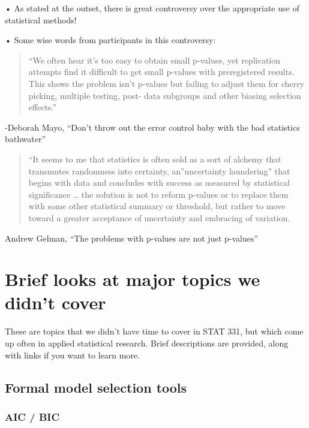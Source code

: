\documentclass[
  letterpaper,
  DIV=11,
  numbers=noendperiod]{scrreprt}
\begin{document}
• As stated at the outset, there is great controversy over the
appropriate use of statistical methods!

• Some wise words from participants in this controversy:

\begin{quote}
``We often hear it's too easy to obtain small p-values, yet replication
attempts find it difficult to get small p-values with preregistered
results. This shows the problem isn't p-values but failing to adjust
them for cherry picking, multiple testing, post- data subgroups and
other biasing selection effects.''
\end{quote}

-Deborah Mayo, ``Don't throw out the error control baby with the bad
statistics bathwater''

\begin{quote}
``It seems to me that statistics is often sold as a sort of alchemy that
transmutes randomness into certainty, an''uncertainty laundering'' that
begins with data and concludes with success as measured by statistical
significance \ldots{} the solution is not to reform p-values or to
replace them with some other statistical summary or threshold, but
rather to move toward a greater acceptance of uncertainty and embracing
of variation.
\end{quote}

Andrew Gelman, ``The problems with p-values are not just p-values''


\hypertarget{brief-looks-at-major-topics-we-didnt-cover}{%
\chapter{Brief looks at major topics we didn't
cover}\label{brief-looks-at-major-topics-we-didnt-cover}}

These are topics that we didn't have time to cover in STAT 331, but
which come up often in applied statistical research. Brief descriptions
are provided, along with links if you want to learn more.

\hypertarget{formal-model-selection-tools}{%
\section{Formal model selection
tools}\label{formal-model-selection-tools}}

\hypertarget{aic-bic}{%
\subsection{AIC / BIC}\label{aic-bic}}
\end{document}
